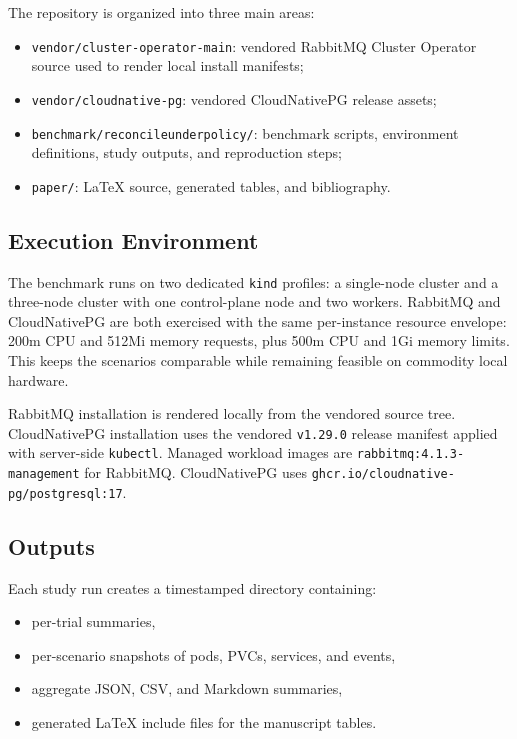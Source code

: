 \documentclass[sigconf,screen]{acmart}
\begin{document}
The repository is organized into three main areas:

\begin{itemize}
  \item \texttt{vendor/cluster-operator-main}: vendored RabbitMQ Cluster
  Operator source used to render local install manifests;
  \item \texttt{vendor/cloudnative-pg}: vendored CloudNativePG release assets;
  \item \texttt{benchmark/reconcileunderpolicy/}: benchmark scripts,
  environment definitions, study outputs, and reproduction steps;
  \item \texttt{paper/}: LaTeX source, generated tables, and bibliography.
\end{itemize}

\subsection{Execution Environment}

The benchmark runs on two dedicated \texttt{kind} profiles: a single-node
cluster and a three-node cluster with one control-plane node and two workers.
RabbitMQ and CloudNativePG are both exercised with the same per-instance
resource envelope: 200m CPU and 512Mi memory requests, plus 500m CPU and 1Gi
memory limits. This keeps the scenarios comparable while remaining feasible on
commodity local hardware.

RabbitMQ installation is rendered locally from the vendored source tree.
CloudNativePG installation uses the vendored \texttt{v1.29.0} release manifest
applied with server-side \texttt{kubectl}. Managed workload images are
\texttt{rabbitmq:4.1.3-management} for RabbitMQ. CloudNativePG uses
\texttt{ghcr.io/cloudnative-pg/postgresql:17}.

\subsection{Outputs}

Each study run creates a timestamped directory containing:

\begin{itemize}
  \item per-trial summaries,
  \item per-scenario snapshots of pods, PVCs, services, and events,
  \item aggregate JSON, CSV, and Markdown summaries,
  \item generated LaTeX include files for the manuscript tables.
\end{itemize}
\end{document}
